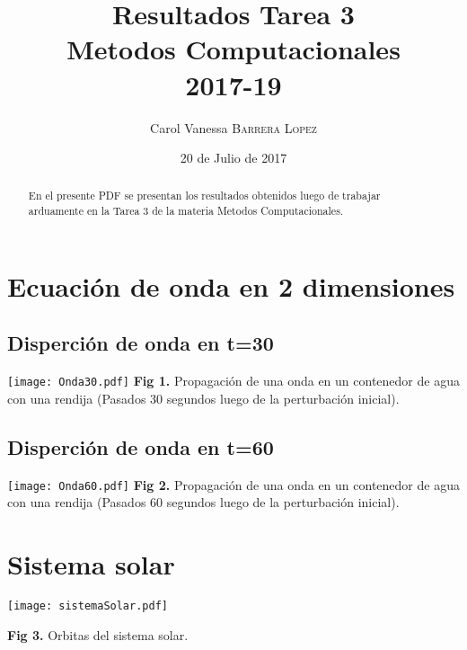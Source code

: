 \documentclass{article}
\title{Resultados Tarea 3 \\ Metodos Computacionales \\ 2017-19} %
\author{Carol Vanessa \textsc{Barrera Lopez}} %
\date{20 de Julio de 2017} %
\begin{document}
\maketitle %

\space
\space
\space
\space
\space
\space
\begin{abstract}
En el presente PDF se presentan los resultados obtenidos luego de trabajar arduamente en la Tarea 3 de la materia Metodos Computacionales. 
\end{abstract}


\section{Ecuaci\'on de onda en 2 dimensiones}
\subsection{Disperci\'on de onda en t=30}
\begin{centering}
\hspace{1cm}\texttt{[image: Onda30.pdf]}
\hspace{20cm}\textbf{Fig 1.} Propagaci\'on de una onda en un contenedor de agua con una rendija (Pasados 30 segundos luego de la perturbaci\'on inicial).\centering
\end{centering}
\subsection{Disperci\'on de onda en t=60}
\begin{centering}
\hspace{1cm}\texttt{[image: Onda60.pdf]}
\hspace{20cm}\textbf{Fig 2.} Propagaci\'on de una onda en un contenedor de agua con una rendija (Pasados 60 segundos luego de la perturbaci\'on inicial).\centering
\end{centering}




\section{Sistema solar}

\hspace{1cm}\texttt{[image: sistemaSolar.pdf]}

\textbf{Fig 3.} Orbitas del sistema solar.\centering
\end{document}
